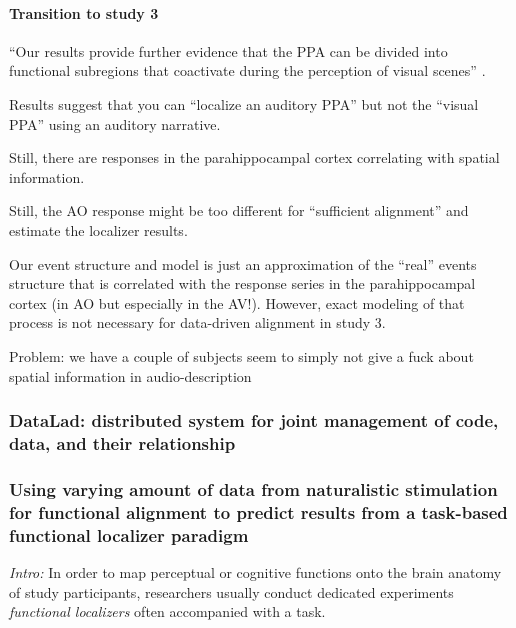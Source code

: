 \paragraph{Transition to study 3}



%
``Our results provide further evidence that the PPA can be divided into
functional subregions that coactivate during the perception of visual scenes''
\citep{haeusler2022processing}.

%
Results suggest that you can ``localize an auditory PPA'' but not the ``visual
PPA'' using an auditory narrative.

%
Still, there are responses in the parahippocampal cortex correlating with
spatial information.

%
Still, the AO response might be too different for ``sufficient alignment'' and
estimate the localizer results.

%
Our event structure and model is just an approximation of the ``real'' events
structure that is correlated with the response series in the parahippocampal
cortex (in AO but especially in the AV!).
%
However, exact modeling of that process is not necessary for data-driven
alignment in study 3.

%
Problem: we have a couple of subjects seem to simply not give a fuck about
spatial information in audio-description


\subsubsection{DataLad: distributed system for joint management of code, data,
and their relationship}



\subsubsection{Using varying amount of data from naturalistic stimulation for
functional alignment to predict results from a task-based functional localizer
paradigm}



\textit{Intro:} In order to map perceptual or cognitive functions onto the brain
anatomy of study participants, researchers usually conduct dedicated experiments
\textit{functional localizers} often accompanied with a task.


